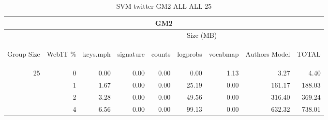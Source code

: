 \begin{center}
\begin{table}[htbp] 
 \begin{center}
\begin{tabular}{ | r | r | r | r | r | r | r | r | r |}
\hline
\multicolumn{9}{|c|}{GM2}\\
\hline
 & & \multicolumn{7}{|c|}{Size (MB)}\\ \cline{3-9}
\begin{sideways}Group Size\end{sideways} & \begin{sideways}Web1T \% \end{sideways} & \begin{sideways}keys.mph\end{sideways} & \begin{sideways}signature\end{sideways} & \begin{sideways}counts\end{sideways} & \begin{sideways}logprobs\end{sideways} & \begin{sideways}vocabmap\end{sideways} & \begin{sideways}Authors Model \end{sideways} & \begin{sideways}TOTAL\end{sideways}\\
\hline
\multirow{3}{*}{25}
 & 0 & 0.00 & 0.00 & 0.00 & 0.00 & 1.13 & 3.27 & 4.40\\ \cline{2-9}
 & 1 & 1.67 & 0.00 & 0.00 & 25.19 & 0.00 & 161.17 & 188.03\\ \cline{2-9}
 & 2 & 3.28 & 0.00 & 0.00 & 49.56 & 0.00 & 316.40 & 369.24\\ \cline{2-9}
 & 4 & 6.56 & 0.00 & 0.00 & 99.13 & 0.00 & 632.32 & 738.01\\ \cline{2-9}
\hline
\end{tabular}
\caption{SVM-twitter-GM2-ALL-ALL-25}
\label{table:SVM-twitter-GM2-ALL-ALL-25}
\end{center}
 \end{table}
\end{center}

